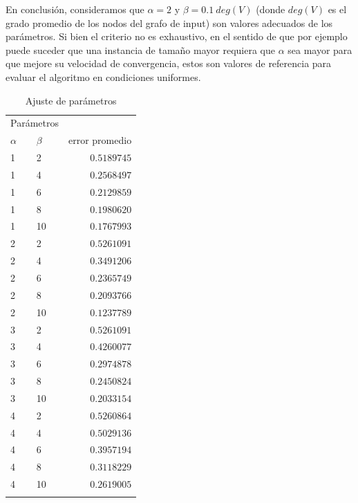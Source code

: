 \documentclass[10pt, a4paper, twocolumn]{article} %
\begin{document}
\smallskip

En conclusión, consideramos que $\alpha = 2$ y $\beta = 0.1 \ deg(V)$ 
(donde $deg(V)$ es el grado promedio de los nodos del grafo de input) 
son valores adecuados de los parámetros. Si bien  el criterio no es 
exhaustivo, en el sentido de que por ejemplo puede suceder que una 
instancia de tamaño mayor requiera que $\alpha$ sea mayor para que 
mejore su velocidad de convergencia, estos son valores de referencia 
para evaluar el algoritmo en condiciones uniformes.

\begin{table}
	\caption{Ajuste de parámetros}
	\centering
	\begin{tabular}{llr}
		\toprule
		\multicolumn{2}{c}{Parámetros} \\
		\cmidrule(r){1-2}
		$\alpha$ & $\beta$ & error promedio \\
		\midrule
		1 & 2 & $0.5189745$ \\
		1 & 4 & $0.2568497$ \\
		1 & 6 & $0.2129859$ \\
		1 & 8 & $0.1980620$ \\
		1 & 10 & $0.1767993$ \\
		2 & 2 & $0.5261091$ \\
		2 & 4 & $0.3491206$ \\
		2 & 6 & $0.2365749$ \\
		2 & 8 & $0.2093766$ \\
		2 & 10 & $0.1237789$ \\
		3 & 2 & $0.5261091$ \\
		3 & 4 & $0.4260077$ \\
		3 & 6 & $0.2974878$ \\
		3 & 8 & $0.2450824$ \\
		3 & 10 & $0.2033154$ \\
		4 & 2 & $0.5260864$ \\
		4 & 4 & $0.5029136$ \\
		4 & 6 & $0.3957194$ \\
		4 & 8 & $0.3118229$ \\
		4 & 10 & $0.2619005$ \\
		\bottomrule
		\label{tab:ajuste1}
	\end{tabular}
\end{table}
\end{document}
